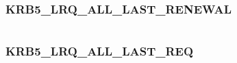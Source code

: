 \documentclass[letterpaper,10pt,english]{sphinxmanual}
\begin{document}
\begin{fulllineitems}
\label{appdev/refs/macros/KRB5_LRQ_ALL_LAST_INITIAL:KRB5_LRQ_ALL_LAST_INITIAL}
\end{fulllineitems}


\begin{tabulary}{\linewidth}{|L|L|}
\hline

 & 
\\
\hline\end{tabulary}



\subsubsection{KRB5\_LRQ\_ALL\_LAST\_RENEWAL}
\label{appdev/refs/macros/KRB5_LRQ_ALL_LAST_RENEWAL:krb5-lrq-all-last-renewal}\label{appdev/refs/macros/KRB5_LRQ_ALL_LAST_RENEWAL:krb5-lrq-all-last-renewal-data}\label{appdev/refs/macros/KRB5_LRQ_ALL_LAST_RENEWAL::doc}

\begin{fulllineitems}
\label{appdev/refs/macros/KRB5_LRQ_ALL_LAST_RENEWAL:KRB5_LRQ_ALL_LAST_RENEWAL}
\end{fulllineitems}


\begin{tabulary}{\linewidth}{|L|L|}
\hline

 & 
\\
\hline\end{tabulary}



\subsubsection{KRB5\_LRQ\_ALL\_LAST\_REQ}
\label{appdev/refs/macros/KRB5_LRQ_ALL_LAST_REQ::doc}\label{appdev/refs/macros/KRB5_LRQ_ALL_LAST_REQ:krb5-lrq-all-last-req}\label{appdev/refs/macros/KRB5_LRQ_ALL_LAST_REQ:krb5-lrq-all-last-req-data}

\begin{fulllineitems}
\label{appdev/refs/macros/KRB5_LRQ_ALL_LAST_REQ:KRB5_LRQ_ALL_LAST_REQ}
\end{fulllineitems}
\end{document}
